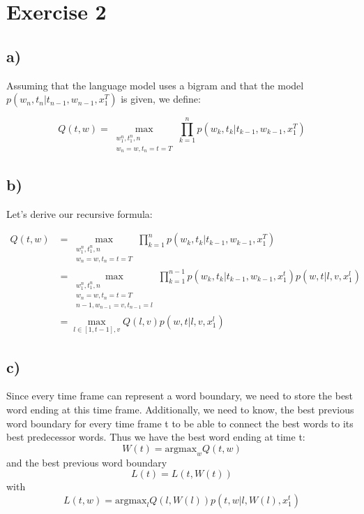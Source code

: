 \section*{Exercise 2} %
\label{sec:section_name}

\subsection*{a)} %
\label{sub:a}

Assuming that the language model uses a bigram and that the model $p(w_n,t_n|t_{n-1}, w_{n-1}, x_1^T)$ is given, 
we define:

\[
	Q(t,w) = \max_{\substack{w_1^n, t_1^n, n \\ w_n = w, t_n = t = T}} \prod_{k = 1}^n p(w_k,t_k|t_{k-1}, w_{k-1}, x_1^T)
\]

\subsection*{b)}%
\label{sub:b_}

Let's derive our recursive formula: 

\begin{align*}
	Q(t,w) &= \max_{\substack{w_1^n, t_1^n, n \\ w_n = w, t_n = t = T}} \prod_{k = 1}^n p(w_k,t_k|t_{k-1}, w_{k-1}, x_1^T) \\
		&= \max_{\substack{w_1^n, t_1^n, n \\ w_n = w, t_n = t = T \\ n-1, w_{n-1} = v, t_{n-1} = l }} \prod_{k = 1}^{n-1} p(w_k,t_k|t_{k-1}, w_{k-1}, x_1^t) p(w,t|l,v,x_1^l) \\
		&= \max_{l \in \left[1,t-1\right],v} Q(l,v) p(w,t|l,v,x_1^l)
\end{align*}


\subsection*{c)}%
\label{sub:c_}

Since every time frame can represent a word boundary, we need to store the 
best word ending at this time frame.
Additionally, we need to know, the best previous word boundary for every time frame t to 
be able to connect the best words to its best predecessor words.
Thus we have the best word ending at time t: 
\[
	W(t) = \text{argmax}_w Q(t,w) 
\]
and the best previous word boundary 
\[
	L(t) = L(t,W(t)) 
\]
with
\[
	L(t,w) = \text{argmax}_l Q(l,W(l)) p(t,w|l,W(l),x_1^t) 
\]

